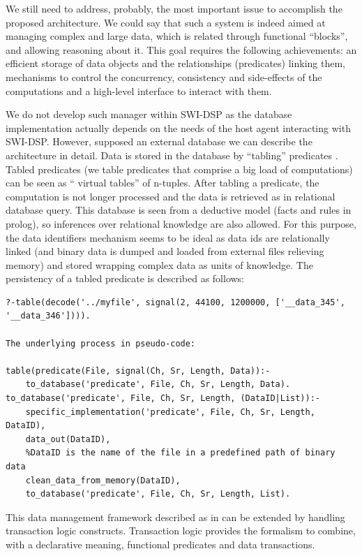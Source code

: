 \documentclass[runningheads]{llncs}
\begin{document}
We still need to address, probably, the most important issue to accomplish the proposed architecture. We could say that such a system is indeed aimed at managing complex and large data, which is related through functional ``blocks'', and allowing reasoning about it. This goal requires the following achievements: an efficient storage of data objects and the relationships (predicates) linking them, mechanisms to control the concurrency, consistency and side-effects of the computations and a high-level interface to interact with them.

We do not develop such manager within SWI-DSP as the database implementation actually depends on the needs of the host agent interacting with SWI-DSP. However, supposed an external database we can describe the architecture in detail. Data is stored in the database by ``tabling'' predicates \cite{aes2006}. Tabled predicates (we table predicates that comprise a big load of computations) can be seen as `` virtual tables'' of n-tuples. After tabling a predicate, the computation is not longer processed and the data is retrieved as in relational database query. This database is seen from a deductive model (facts and rules in prolog), so inferences over relational knowledge are also allowed. For this purpose, the data identifiers mechanism seems to be ideal as data ids are relationally linked (and binary data is dumped and loaded from external files relieving memory) and stored wrapping complex data as units of knowledge. The persistency of a tabled predicate is described as follows:

\begin{verbatim}
?-table(decode('../myfile', signal(2, 44100, 1200000, ['__data_345', '__data_346']))).

The underlying process in pseudo-code:

table(predicate(File, signal(Ch, Sr, Length, Data)):-
	to_database('predicate', File, Ch, Sr, Length, Data).
to_database('predicate', File, Ch, Sr, Length, (DataID|List)):-
	specific_implementation('predicate', File, Ch, Sr, Length, DataID),
	data_out(DataID), 
	%DataID is the name of the file in a predefined path of binary data
	clean_data_from_memory(DataID),
	to_database('predicate', File, Ch, Sr, Length, List).	
\end{verbatim}

This data management framework described as in \cite{aes2006} can be extended by handling transaction logic constructs. Transaction logic provides the formalism to combine, with a declarative meaning, functional predicates and data transactions.
\end{document}
